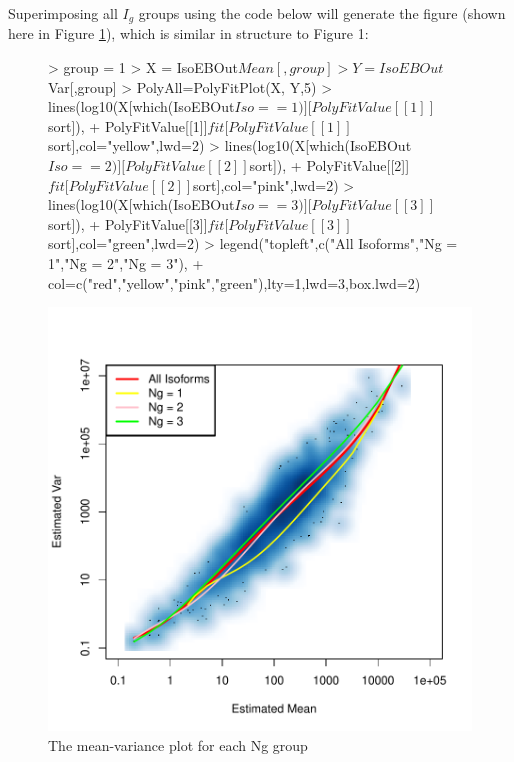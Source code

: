 \documentclass{article}
\begin{document}
\newpage
Superimposing all $I_g$ groups using the code below will generate the figure (shown 
here in Figure \ref{fig:IsoSimuNg}), which is similar in structure to Figure 1:


\begin{figure}[h!]
\centering
\begin{Schunk}
\begin{Sinput}
> group = 1
> X = IsoEBOut$Mean[,group]
> Y = IsoEBOut$Var[,group]
> PolyAll=PolyFitPlot(X, Y,5)
> lines(log10(X[which(IsoEBOut$Iso == 1)][PolyFitValue[[1]]$sort]), 
+ PolyFitValue[[1]]$fit[PolyFitValue[[1]]$sort],col="yellow",lwd=2)
> lines(log10(X[which(IsoEBOut$Iso == 2)][PolyFitValue[[2]]$sort]), 
+ PolyFitValue[[2]]$fit[PolyFitValue[[2]]$sort],col="pink",lwd=2)
> lines(log10(X[which(IsoEBOut$Iso == 3)][PolyFitValue[[3]]$sort]), 
+ PolyFitValue[[3]]$fit[PolyFitValue[[3]]$sort],col="green",lwd=2)
> legend("topleft",c("All Isoforms","Ng = 1","Ng = 2","Ng = 3"),
+ col=c("red","yellow","pink","green"),lty=1,lwd=3,box.lwd=2)
\end{Sinput}
\end{Schunk}
\includegraphics{EBSeq_Vignette-033}
\caption{The mean-variance plot for each Ng group}
\label{fig:IsoSimuNg}
\end{figure}
\end{document}
